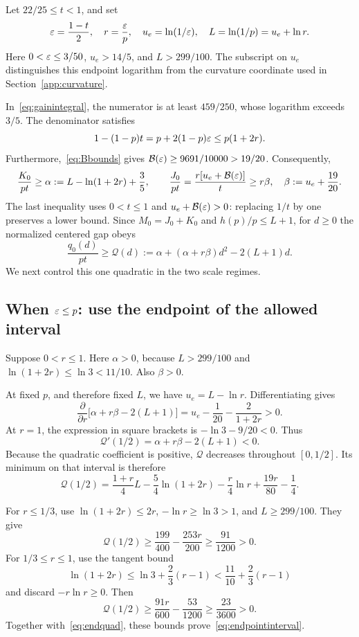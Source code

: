Let $22/25\le t<1$, and set
\[
\varepsilon=\frac{1-t}{2},\quad r=\frac{\varepsilon}{p},\quad
u_e=\ln(1/\varepsilon),\quad L=\ln(1/p)=u_e+\ln r.
\]
Here $0<\varepsilon\le3/50$, $u_e>14/5$, and $L>299/100$. The subscript on $u_e$ distinguishes this endpoint logarithm from the curvature coordinate used in Section~\ref{app:curvature}.

In~\eqref{eq:gainintegral}, the numerator is at least $459/250$, whose logarithm exceeds $3/5$. The denominator satisfies
\[
1-(1-p)t=p+2(1-p)\varepsilon\le p(1+2r).
\]
Furthermore,~\eqref{eq:Bbounds} gives
$\mathcal B(\varepsilon)\ge9691/10000>19/20$. Consequently,
\begin{equation}\label{eq:alphabeta}
\frac{K_0}{pt}\ge\alpha:=L-\ln(1+2r)+\frac35,
\qquad
\frac{J_0}{pt}=\frac{r[u_e+\mathcal B(\varepsilon)]}{t}
\ge r\beta,\quad \beta:=u_e+\frac{19}{20}.
\end{equation}
The last inequality uses $0<t\le1$ and $u_e+\mathcal B(\varepsilon)>0$: replacing $1/t$ by one preserves a lower bound. Since $M_0=J_0+K_0$ and $h(p)/p\le L+1$, for $d\ge0$ the normalized centered gap obeys
\begin{equation}\label{eq:endquad}
\frac{q_0(d)}{pt}\ge\mathcal Q(d)
:=\alpha+(\alpha+r\beta)d^2-2(L+1)d.
\end{equation}
We next control this one quadratic in the two scale regimes.

\subsection{When $\varepsilon\le p$: use the endpoint of the allowed interval}\label{app:rsmall}
Suppose $0<r\le1$. Here $\alpha>0$, because $L>299/100$ and $\ln(1+2r)\le\ln3<11/10$. Also $\beta>0$.

At fixed $p$, and therefore fixed $L$, we have $u_e=L-\ln r$. Differentiating gives
\[
\frac{\partial}{\partial r}\bigl[\alpha+r\beta-2(L+1)\bigr]
=u_e-\frac1{20}-\frac2{1+2r}>0.
\]
At $r=1$, the expression in square brackets is $-\ln3-9/20<0$. Thus
\[
\mathcal Q'(1/2)=\alpha+r\beta-2(L+1)<0.
\]
Because the quadratic coefficient is positive, $\mathcal Q$ decreases throughout $[0,1/2]$. Its minimum on that interval is therefore
\begin{equation}\label{eq:endqhalf}
\mathcal Q(1/2)=\frac{1+r}{4}L-\frac54\ln(1+2r)
-\frac r4\ln r+\frac{19r}{80}-\frac14.
\end{equation}

For $r\le1/3$, use $\ln(1+2r)\le2r$, $-\ln r\ge\ln3>1$, and $L\ge299/100$. They give
\[
\mathcal Q(1/2)\ge\frac{199}{400}-\frac{253r}{200}
\ge\frac{91}{1200}>0.
\]
For $1/3\le r\le1$, use the tangent bound
\[
\ln(1+2r)\le\ln3+\frac23(r-1)<\frac{11}{10}+\frac23(r-1)
\]
and discard $-r\ln r\ge0$. Then
\[
\mathcal Q(1/2)\ge\frac{91r}{600}-\frac{53}{1200}
\ge\frac{23}{3600}>0.
\]
Together with~\eqref{eq:endquad}, these bounds prove~\eqref{eq:endpointinterval}.

